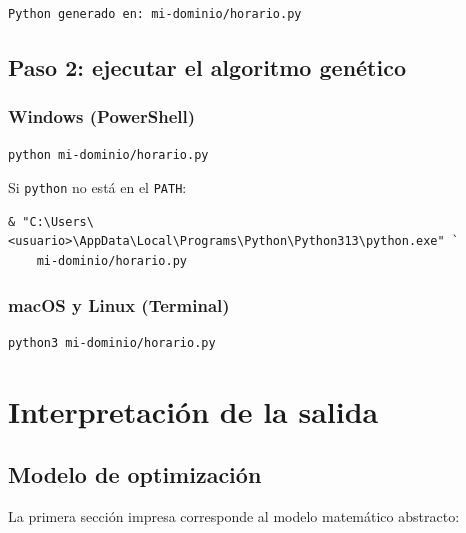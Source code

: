 \documentclass[12pt,a4paper]{article}
\newcommand{\code}[1]{\texttt{#1}}
\begin{document}
\begin{lstlisting}[style=output]
Python generado en: mi-dominio/horario.py
\end{lstlisting}

\subsection{Paso 2: ejecutar el algoritmo genético}

\subsubsection*{Windows (PowerShell)}

\begin{lstlisting}[style=shell]
python mi-dominio/horario.py
\end{lstlisting}

Si \code{python} no está en el \code{PATH}:

\begin{lstlisting}[style=shell]
& "C:\Users\<usuario>\AppData\Local\Programs\Python\Python313\python.exe" `
    mi-dominio/horario.py
\end{lstlisting}

\subsubsection*{macOS y Linux (Terminal)}

\begin{lstlisting}[style=shell]
python3 mi-dominio/horario.py
\end{lstlisting}

\section{Interpretación de la salida}
\label{sec:salida}

\subsection{Modelo de optimización}

La primera sección impresa corresponde al modelo matemático abstracto:
\end{document}

